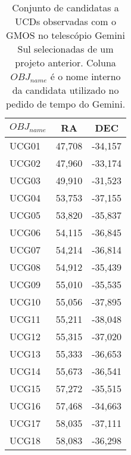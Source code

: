 \begin{table}[!ht]
    \centering
    \caption{Conjunto de candidatas a UCDs observadas com o GMOS no telescópio Gemini Sul selecionadas de um projeto anterior. Coluna $OBJ_{name}$ é o nome interno da candidata utilizado no pedido de tempo do Gemini.}
    \begin{tabular}{lcc}
        \toprule
        $OBJ_{name}$ & RA     & DEC     \\
        \midrule
        UCG01     & 47,708 & -34,157 \\
        UCG02     & 47,960 & -33,174 \\
        UCG03     & 49,910 & -31,523 \\
        UCG04     & 53,753 & -37,155 \\
        UCG05     & 53,820 & -35,837 \\
        UCG06     & 54,115 & -36,845 \\
        UCG07     & 54,214 & -36,814 \\
        UCG08     & 54,912 & -35,439 \\
        UCG09     & 55,010 & -35,535 \\
        UCG10     & 55,056 & -37,895 \\
        UCG11     & 55,211 & -38,048 \\
        UCG12     & 55,315 & -37,020 \\
        UCG13     & 55,333 & -36,653 \\
        UCG14     & 55,673 & -36,541 \\
        UCG15     & 57,272 & -35,515 \\
        UCG16     & 57,468 & -34,663 \\
        UCG17     & 58,035 & -37,111 \\
        UCG18     & 58,083 & -36,298 \\
        \bottomrule
    \end{tabular}
    \label{candidatas_espectroscopia_1}
\end{table}


